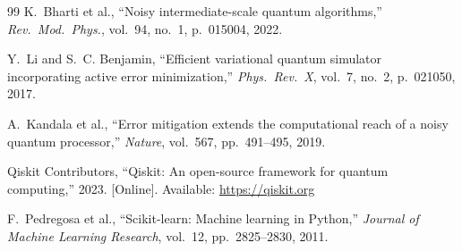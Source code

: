 \documentclass[journal]{IEEEtran}
\begin{document}
\begin{thebibliography}{99}
K.~Bharti et al., ``Noisy intermediate-scale quantum algorithms,'' \emph{Rev.\ Mod.\ Phys.}, vol.~94, no.~1, p.~015004, 2022.

Y.~Li and S.~C. Benjamin, ``Efficient variational quantum simulator incorporating active error minimization,'' \emph{Phys.\ Rev.\ X}, vol.~7, no.~2, p.~021050, 2017.

A.~Kandala et al., ``Error mitigation extends the computational reach of a noisy quantum processor,'' \emph{Nature}, vol.~567, pp.~491--495, 2019.

Qiskit Contributors, ``Qiskit: An open-source framework for quantum computing,'' 2023. [Online]. Available: \url{https://qiskit.org}

F.~Pedregosa et al., ``Scikit-learn: Machine learning in Python,'' \emph{Journal of Machine Learning Research}, vol.~12, pp.~2825--2830, 2011.

\end{thebibliography}
\end{document}
